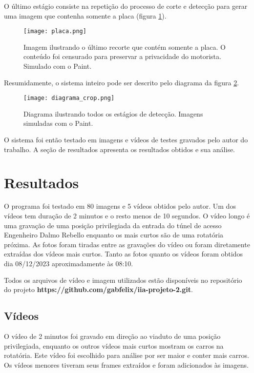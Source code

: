 \documentclass[conference]{IEEEtran}
\begin{document}
O último estágio consiste na repetição do processo de corte e detecção para gerar uma imagem que contenha somente a placa (figura \ref{fig:placa_recorte}).

\begin{figure}
    \centering
    \texttt{[image: placa.png]}
    \caption{Imagem ilustrando o último recorte que contém somente a placa. O conteúdo foi censurado para preservar a privacidade do motorista. Simulado com o Paint.}
    \label{fig:placa_recorte}
\end{figure}

Resumidamente, o sistema inteiro pode ser descrito pelo diagrama da figura \ref{fig:diagrama_sistema}.

\begin{figure}
    \centering
    \texttt{[image: diagrama\_crop.png]}
    \caption{Diagrama ilustrando todos os estágios de detecção. Imagens simuladas com o Paint.}
    \label{fig:diagrama_sistema}
\end{figure}

O sistema foi então testado em imagens e vídeos de testes gravados pelo autor do trabalho. A seção de resultados apresenta os resultados obtidos e sua análise.

\section{Resultados}
\label{sec:resultados}
O programa foi testado em 80 imagens e 5 vídeos obtidos pelo autor. Um dos vídeos tem duração de 2 minutos e o resto menos de 10 segundos.
O vídeo longo é uma gravação de uma posição privilegiada da entrada do túnel de acesso Engenheiro Dalmo Rebello enquanto os mais curtos são de uma rotatória próxima.
As fotos foram tiradas entre as gravações do vídeo ou foram diretamente extraídas dos vídeos mais curtos.
Tanto as fotos quanto os vídeos foram obtidos dia 08/12/2023 aproximadamente às 08:10.

Todos os arquivos de vídeo e imagem utilizados estão disponíveis no repositório do projeto \textbf{https://github.com/gabfelix/iia-projeto-2.git}.

\subsection{Vídeos}
O vídeo de 2 minutos foi gravado em direção ao viaduto de uma posição privilegiada, enquanto os outros vídeos mais curtos mostram os carros na rotatória.
Este vídeo foi escolhido para análise por ser maior e conter mais carros. Os vídeos menores tiveram seus frames extraídos e foram adicionados às imagens.
\end{document}
